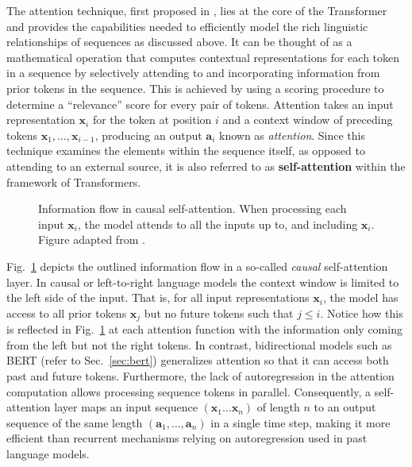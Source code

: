 The attention technique, first proposed in \cite{bahdanau2015neural}, lies at
the core of the Transformer and provides the capabilities needed to efficiently
model the rich linguistic relationships of sequences as discussed above. It can
be thought of as a mathematical operation that computes contextual
representations for each token in a sequence by selectively attending to and
incorporating information from prior tokens in the sequence. This is achieved by
using a scoring procedure to determine a ``relevance'' score for every pair of
tokens. Attention takes an input representation $\bm{x}_i$ for the token at
position $i$ and a context window of preceding tokens $\bm{x}_1, \ldots ,
\bm{x}_{i-1}$, producing an output $\bm{a}_i$ known as \textit{attention}. Since
this technique examines the elements within the sequence itself, as opposed to
attending to an external source\footnotemark{}, it is also referred to as
\textbf{self-attention} within the framework of Transformers.

\begin{figure}[htb]
    \centering
    \resizebox*{.8\textwidth}{!}{}
    \caption[Information flow in causal self-attention]{Information flow in
    causal self-attention. When processing each input $\bm{x}_{i}$, the model
    attends to all the inputs up to, and including $\bm{x}_{i}$. Figure adapted
    from \cite{jurafsky2025slp}.}
    \label{fig:attention_layer}
\end{figure}


Fig.~\ref{fig:attention_layer} depicts the outlined information flow in a
so-called \textit{causal} self-attention layer. In causal or left-to-right
language models the context window is limited to the left side of the input.
That is, for all input representations $\bm{x}_i$, the model has access to all
prior tokens $\bm{x}_j$ but no future tokens such that $j \leq i$. Notice how
this is reflected in Fig.~\ref{fig:attention_layer} at each attention function
with the information only coming from the left but not the right tokens. In
contrast, bidirectional models such as BERT (refer to Sec.~\ref{sec:bert})
generalizes attention so that it can access both past and future tokens.
Furthermore, the lack of autoregression in the attention computation allows
processing sequence tokens in parallel. Consequently, a self-attention layer
maps an input sequence $(\bm{x}_1 \ldots \bm{x}_n)$ of length $n$ to an output
sequence of the same length $(\bm{a}_1, \ldots, \bm{a}_n)$ in a single time
step, making it more efficient than recurrent mechanisms relying on
autoregression used in past language models.


